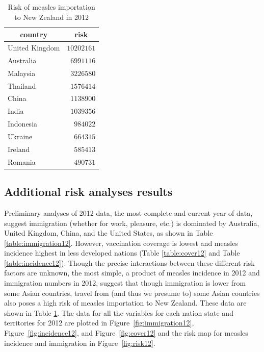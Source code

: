 \documentclass{article}
\begin{document}
\begin{table}
\caption{Risk of measles importation to New Zealand in 2012}
\begin{center}
\begin{tabular}{lr}
\hline\hline
\multicolumn{1}{c}{country}&\multicolumn{1}{c}{risk}\tabularnewline
\hline
United Kingdom&$10202161$\tabularnewline
Australia&$ 6991116$\tabularnewline
Malaysia&$ 3226580$\tabularnewline
Thailand&$ 1576414$\tabularnewline
China&$ 1138900$\tabularnewline
India&$ 1039356$\tabularnewline
Indonesia&$  984022$\tabularnewline
Ukraine&$  664315$\tabularnewline
Ireland&$  585413$\tabularnewline
Romania&$  490731$\tabularnewline
\hline
\end{tabular}\end{center}\label{table:risk12}
\end{table}

\subsection{Additional risk analyses results}

Preliminary analyses of 2012 data, the most complete and current year of data, suggest immigration (whether for work, pleasure, etc.) is dominated by Australia, United Kingdom, China, and the United States, as shown in Table \ref{table:immigration12}. However, vaccination coverage is lowest and measles incidence highest in less developed nations (Table \ref{table:cover12} and Table \ref{table:incidence12}). Though the precise interactions between these different risk factors are unknown, the most simple, a product of measles incidence in 2012 and immigration numbers in 2012, suggest that though immigration is lower from some Asian countries, travel from (and thus we presume to) some Asian countries also poses a high risk of measles importation to New Zealand. These data are shown in Table \ref{table:risk12}. The data for all the variables for each nation state and territories for 2012 are plotted in Figure~\ref{fig:immigration12}, Figure~\ref{fig:incidence12}, and Figure~\ref{fig:cover12} and the risk map for measles incidence and immigration in Figure~\ref{fig:risk12}.
\end{document}
